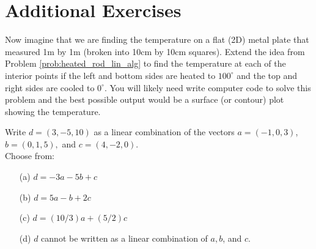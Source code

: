 \section{Additional Exercises}


\begin{problem}
    Now imagine that we are finding the temperature on a flat (2D) metal plate that
    measured 1m
    by 1m (broken into 10cm by 10cm squares).  Extend the idea from Problem
    \ref{prob:heated_rod_lin_alg} to find the temperature at each of
    the interior points if the left and bottom sides are heated to $100^\circ$ and the top
    and right sides are cooled to $0^\circ$.  You will likely need write computer code to
    solve this problem and the best possible output would be a surface (or contour) plot
    showing the temperature.
\end{problem}

\begin{problem}
    Write $d = (3,-5,10)$ as a linear combination of the vectors $a = (-1,0,3)$,
    $b = (0,1,5),$ and $c = (4,-2,0)$. \\
    Choose from:
    \begin{enumerate}
        \item[(a)] $d = -3a - 5b + c$
        \item[(b)] $d = 5a - b + 2c$
        \item[(c)] $d = (10/3)a + (5/2)c$
        \item[(d)] $d$ cannot be written as a linear combination of $a, b$, and $c$.
    \end{enumerate}
\end{problem}

%             
% 
